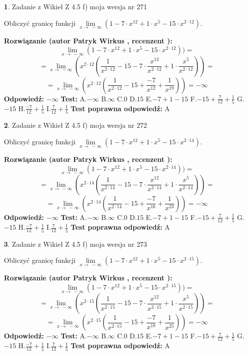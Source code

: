 \documentclass[12pt, a4paper]{article}
\theoremstyle{definition} %
\newtheorem{zad}{}
\newcommand{\zadStart}[1]{\begin{zad}#1\newline}
\newcommand{\zadStop}{\end{zad}}
\newcommand{\rozwStart}[2]{\noindent \textbf{Rozwiązanie (autor #1 , recenzent #2): }\newline}
\newcommand{\rozwStop}{\newline}
\newcommand{\odpStart}{\noindent \textbf{Odpowiedź:}\newline}
\newcommand{\odpStop}{\newline}
\newcommand{\testStart}{\noindent \textbf{Test:}\newline}
\newcommand{\testStop}{\newline}
\newcommand{\kluczStart}{\noindent \textbf{Test poprawna odpowiedź:}\newline}
\newcommand{\kluczStop}{\newline}
\begin{document}
\zadStart{Zadanie z Wikieł Z 4.5 f) moja wersja nr 271}



Obliczyć granicę funkcji  $\lim\limits_{x\to\ -\infty}(1 - 7 \cdot x^{12}+1 \cdot x^{5}- 15 \cdot x^{2\cdot12})$.
\zadStop
\rozwStart{Patryk Wirkus}{}
$$\lim\limits_{x\to\ -\infty}(1 - 7 \cdot x^{12}+1 \cdot x^{5}- 15 \cdot x^{2\cdot12}))=$$
$$=\lim\limits_{x\to\ -\infty}(x^{2\cdot12}(\frac{1}{x^{2\cdot12}}-15 -7 \cdot \frac{x^{12}}{x^{2\cdot12}}+1 \cdot \frac{x^{5}}{x^{2\cdot12}}))=$$
$$=\lim\limits_{x\to\ -\infty}(x^{2\cdot12}(\frac{1}{x^{2\cdot12}}-15 + \frac{-7}{x^{12}}+ \frac{1}{x^{19}}))=-\infty$$
\rozwStop
\odpStart
$-\infty$
\odpStop
\testStart
A.$-\infty$ B.$\infty$ C.$0$ D.$15$ E.$-7 + 1 - 15$
F.$-15+\frac{7}{12}+\frac{1}{5}$ G.$-15$
H.$\frac{-7}{12}+\frac{1}{5}$
I.$\frac{7}{12}+\frac{1}{5}$
\testStop
\kluczStart
A
\kluczStop



\zadStart{Zadanie z Wikieł Z 4.5 f) moja wersja nr 272}



Obliczyć granicę funkcji  $\lim\limits_{x\to\ -\infty}(1 - 7 \cdot x^{12}+1 \cdot x^{5}- 15 \cdot x^{2\cdot14})$.
\zadStop
\rozwStart{Patryk Wirkus}{}
$$\lim\limits_{x\to\ -\infty}(1 - 7 \cdot x^{12}+1 \cdot x^{5}- 15 \cdot x^{2\cdot14}))=$$
$$=\lim\limits_{x\to\ -\infty}(x^{2\cdot14}(\frac{1}{x^{2\cdot14}}-15 -7 \cdot \frac{x^{12}}{x^{2\cdot14}}+1 \cdot \frac{x^{5}}{x^{2\cdot14}}))=$$
$$=\lim\limits_{x\to\ -\infty}(x^{2\cdot14}(\frac{1}{x^{2\cdot14}}-15 + \frac{-7}{x^{16}}+ \frac{1}{x^{23}}))=-\infty$$
\rozwStop
\odpStart
$-\infty$
\odpStop
\testStart
A.$-\infty$ B.$\infty$ C.$0$ D.$15$ E.$-7 + 1 - 15$
F.$-15+\frac{7}{12}+\frac{1}{5}$ G.$-15$
H.$\frac{-7}{12}+\frac{1}{5}$
I.$\frac{7}{12}+\frac{1}{5}$
\testStop
\kluczStart
A
\kluczStop



\zadStart{Zadanie z Wikieł Z 4.5 f) moja wersja nr 273}



Obliczyć granicę funkcji  $\lim\limits_{x\to\ -\infty}(1 - 7 \cdot x^{12}+1 \cdot x^{5}- 15 \cdot x^{2\cdot15})$.
\zadStop
\rozwStart{Patryk Wirkus}{}
$$\lim\limits_{x\to\ -\infty}(1 - 7 \cdot x^{12}+1 \cdot x^{5}- 15 \cdot x^{2\cdot15}))=$$
$$=\lim\limits_{x\to\ -\infty}(x^{2\cdot15}(\frac{1}{x^{2\cdot15}}-15 -7 \cdot \frac{x^{12}}{x^{2\cdot15}}+1 \cdot \frac{x^{5}}{x^{2\cdot15}}))=$$
$$=\lim\limits_{x\to\ -\infty}(x^{2\cdot15}(\frac{1}{x^{2\cdot15}}-15 + \frac{-7}{x^{18}}+ \frac{1}{x^{25}}))=-\infty$$
\rozwStop
\odpStart
$-\infty$
\odpStop
\testStart
A.$-\infty$ B.$\infty$ C.$0$ D.$15$ E.$-7 + 1 - 15$
F.$-15+\frac{7}{12}+\frac{1}{5}$ G.$-15$
H.$\frac{-7}{12}+\frac{1}{5}$
I.$\frac{7}{12}+\frac{1}{5}$
\testStop
\kluczStart
A
\kluczStop
\end{document}
